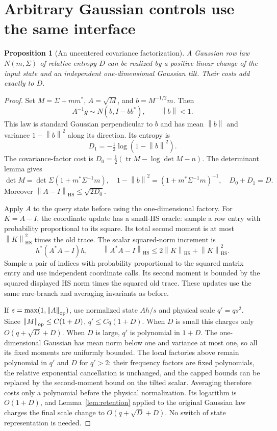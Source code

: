 \documentclass[11pt]{article}
\newtheorem{proposition}[theorem]{Proposition}
\newcommand{\norm}[1]{\left\lVert #1\right\rVert}
\newcommand{\HS}{\mathrm{HS}}
\begin{document}
\section{Arbitrary Gaussian controls use the same interface}
\label{sec:gaussian}
\begin{proposition}[An uncentered covariance factorization]
\label{prop:gaussian}
A Gaussian row law $N(m,\Sigma)$ of relative entropy $D$ can be realized by a positive linear change of the input state and an independent one-dimensional Gaussian tilt. Their costs add exactly to $D$.
\end{proposition}
\begin{proof}
Set $M=\Sigma+mm^*$, $A=\sqrt M$, and $b=M^{-1/2}m$. Then
\[
 A^{-1}g\sim N(b,I-bb^*),\qquad \norm b<1.
\]
This law is standard Gaussian perpendicular to $b$ and has mean $\norm b$ and variance $1-\norm b^2$ along its direction. Its entropy is
\[
 D_1=-\tfrac12\log(1-\norm b^2).
\]
The covariance-factor cost is $D_0=\tfrac12(\operatorname{tr}M-\log\det M-n)$. The determinant lemma gives
\[
 \det M=\det\Sigma(1+m^*\Sigma^{-1}m),\quad
 1-\norm b^2=(1+m^*\Sigma^{-1}m)^{-1},\quad D_0+D_1=D.
\]
Moreover $\norm{A-I}_{\HS}\le\sqrt{2D_0}$.

Apply $A$ to the query state before using the one-dimensional factory. For $K=A-I$, the coordinate update has a small-HS oracle: sample a row entry with probability proportional to its square. Its total second moment is at most $\norm K_{\HS}^2$ times the old trace. The scalar squared-norm increment is
\[
 h^*(A^*A-I)h,
 \qquad \norm{A^*A-I}_{\HS}\le2\norm K_{\HS}+\norm K_{\HS}^2.
\]
Sample a pair of indices with probability proportional to the squared matrix entry and use independent coordinate calls. Its second moment is bounded by the squared displayed HS norm times the squared old trace. These updates use the same rare-branch and averaging invariants as before.

If $s=\max(1,\norm A_{\rm op})$, use normalized state $Ah/s$ and physical scale $q'=qs^2$. Since $\norm M_{\rm op}\le C(1+D)$, $q'\le Cq(1+D)$. When $D$ is small this charges only $O(q+\sqrt D+D)$. When $D$ is large, $q'$ is polynomial in $1+D$. The one-dimensional Gaussian has mean norm below one and variance at most one, so all its fixed moments are uniformly bounded. The local factories above remain polynomial in $q'$ and $D$ for $q'>2$: their frequency factors are fixed polynomials, the relative exponential cancellation is unchanged, and the capped bounds can be replaced by the second-moment bound on the tilted scalar. Averaging therefore costs only a polynomial before the physical normalization. Its logarithm is $O(1+D)$, and Lemma~\ref{lem:retention} applied to the original Gaussian law charges the final scale change to $O(q+\sqrt D+D)$. No switch of state representation is needed.
\end{proof}
\end{document}
